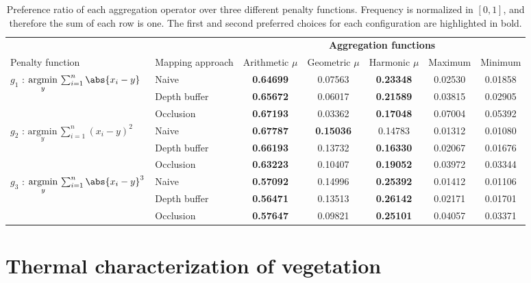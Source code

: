 \renewcommand{\arraystretch}{1.2}
\begin{table}
    \footnotesize
    \centering
    \caption{Preference ratio of each aggregation operator over three different penalty functions. Frequency is normalized in $[0, 1]$, and therefore the sum of each row is one. The first and second preferred choices for each configuration are highlighted in bold. }
    \label{table:thermal_aggregation_frequency}
    \begin{tabular}{@{}llccccc@{} }
    \toprule
    & & \multicolumn{5}{c}{\textbf{Aggregation functions}} \\
    \cmidrule{3-7}
    Penalty function & Mapping approach & Arithmetic $\mu$ & Geometric $\mu$ & Harmonic $\mu$ & Maximum & Minimum\\
    \midrule
    \multirow{2}{*}{$g_1$ : $\underset{y}{\mathrm{argmin}}\, \sum_{i=1}^{n} \abs{x_i - y}$} & Naive & \textbf{0.64699} & 0.07563 & \textbf{0.23348} & 0.02530 & 0.01858 \\
    & Depth buffer & \textbf{0.65672} & 0.06017 & \textbf{0.21589} & 0.03815 & 0.02905 \\
    & Occlusion & \textbf{0.67193} & 0.03362 & \textbf{0.17048} & 0.07004 & 0.05392 \\
    \multirow{2}{*}{$g_2$ : $\underset{y}{\mathrm{argmin}}\, \sum_{i=1}^{n} (x_i - y)^2$} & Naive & \textbf{0.67787} & \textbf{0.15036} & 0.14783 & 0.01312 & 0.01080 \\
    & Depth buffer & \textbf{0.66193} & 0.13732 & \textbf{0.16330} & 0.02067 & 0.01676 \\
    & Occlusion & \textbf{0.63223} & 0.10407 & \textbf{0.19052} & 0.03972 & 0.03344 \\
    \multirow{2}{*}{$g_3$ : $\underset{y}{\mathrm{argmin}}\, \sum_{i=1}^{n} \abs{x_i - y}^3$} & Naive & \textbf{0.57092} & 0.14996 & \textbf{0.25392} & 0.01412 & 0.01106 \\
    & Depth buffer & \textbf{0.56471} & 0.13513 & \textbf{0.26142} & 0.02171 & 0.01701 \\
    & Occlusion & \textbf{0.57647} & 0.09821 & \textbf{0.25101} & 0.04057 & 0.03371 \\
    \bottomrule
    \end{tabular}
    \normalsize
\end{table}
\renewcommand{\arraystretch}{1}

\section{Thermal characterization of vegetation}

